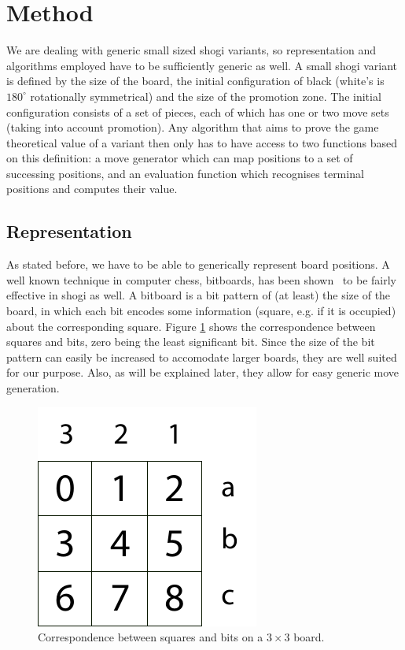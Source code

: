 \documentclass{article}
\begin{document}
\section{Method}
We are dealing with generic small sized shogi variants, so representation and algorithms employed have to be sufficiently generic as well.
A small shogi variant is defined by the size of the board, the initial configuration of black (white's is $180^{\circ}$ rotationally symmetrical) and
the size of the promotion zone. The initial configuration consists of a set of pieces, each of which has one or two move sets (taking into account
promotion). Any algorithm that aims to prove the game theoretical value of a variant then only has to have access to two functions based on this
definition: a move generator which can map positions to a set of successing positions, and an evaluation function which recognises terminal
positions and computes their value.

\subsection{Representation}
\label{sec:rep}
As stated before, we have to be able to generically represent board positions. A well known technique in computer chess, bitboards, has been
shown~\cite{grimbergen2007using} to be fairly effective in shogi as well. A bitboard is a bit pattern of (at least) the size of the board,
in which each bit encodes some information (square, e.g. if it is occupied) about the corresponding square.
Figure \ref{bitsquares} shows the correspondence between squares and bits, zero being the least significant bit.
Since the size of the bit pattern can
easily be increased to accomodate larger boards, they are well suited for our purpose. Also, as will be explained later, they allow for easy
generic move generation.

\begin{figure}
\center
\includegraphics{bitsquares.pdf}
\caption{Correspondence between squares and bits on a $3 \times 3$ board.}
\label{bitsquares}
\end{figure}
\end{document}
